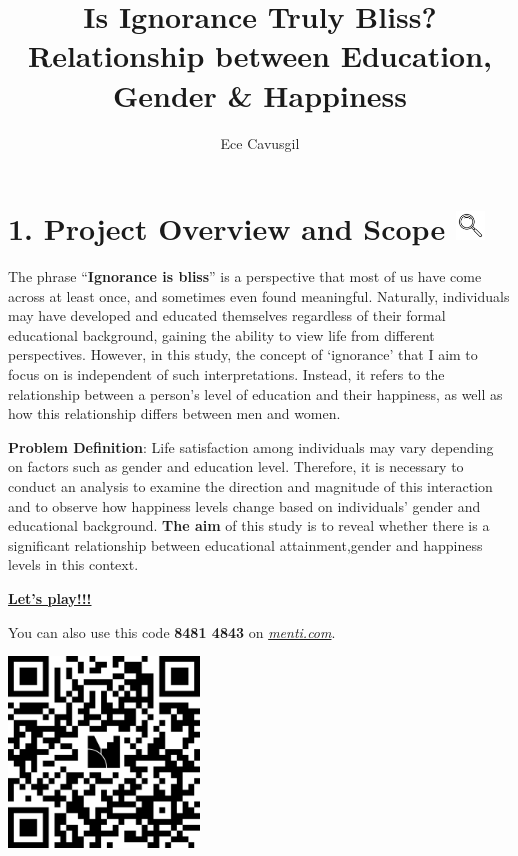 \documentclass[
  11pt,
  a4paper,
  DIV=11,
  numbers=noendperiod]{scrartcl}
\title{Is Ignorance Truly Bliss? Relationship between Education, Gender
\& Happiness}
\author{Ece Cavusgil}
\date{}
\begin{document}
\maketitle


\section[1. Project Overview and Scope \hfill
]{\texorpdfstring{1. Project Overview and Scope
\protect\includegraphics[width=0.3in,height=\textheight,keepaspectratio]{assets/images/scope.png}\hfill
}{1. Project Overview and Scope }}\label{project-overview-and-scope}

The phrase ``{\textbf{Ignorance is bliss}}'' is a perspective that most
of us have come across at least once, and sometimes even found
meaningful. Naturally, individuals may have developed and educated
themselves regardless of their formal educational background, gaining
the ability to view life from different perspectives. However, in this
study, the concept of `ignorance' that I aim to focus on is independent
of such interpretations. Instead, it refers to the relationship between
a person's level of education and their happiness, as well as how this
relationship differs between men and women.

{\textbf{Problem Definition}}: Life satisfaction among individuals may
vary depending on factors such as gender and education level. Therefore,
it is necessary to conduct an analysis to examine the direction and
magnitude of this interaction and to observe how happiness levels change
based on individuals' gender and educational background. {\textbf{The
aim}} of this study is to reveal whether there is a significant
relationship between educational attainment,gender and happiness levels
in this context.

{\href{https://www.mentimeter.com/app/presentation/alfuqmuu3euj5y6s55iocifooenoi4vr/edit?question=gornm6irwd6a}{\textbf{Let's
play!!!}}}

You can also use this code {\textbf{8481 4843}} on
\ul{\emph{menti.com}}.

\begin{center}
\includegraphics[width=2in,height=\textheight,keepaspectratio]{docs/assets/images/qr.png}
\end{center}
\end{document}

